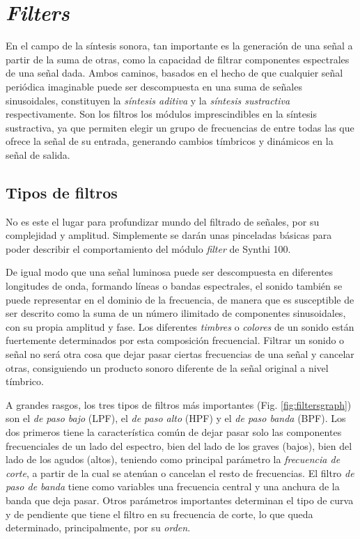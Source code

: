 \section{\textit{Filters}}

En el campo de la síntesis sonora, tan importante es la generación de una señal a partir de la suma de otras, como la capacidad de filtrar componentes espectrales de una señal dada. Ambos caminos, basados en el hecho de que cualquier señal periódica imaginable puede ser descompuesta en una suma de señales sinusoidales, constituyen la \textit{síntesis aditiva} y la \textit{síntesis sustractiva} respectivamente. Son los filtros los módulos imprescindibles en la síntesis sustractiva, ya que permiten elegir un grupo de frecuencias de entre todas las que ofrece la señal de su entrada, generando cambios tímbricos y dinámicos en la señal de salida.

\subsection{Tipos de filtros}

No es este el lugar para profundizar mundo del filtrado de señales, por su complejidad y amplitud. Simplemente se darán unas pinceladas básicas para poder describir el comportamiento del módulo \textit{filter} de Synthi 100.

De igual modo que una señal luminosa puede ser descompuesta en diferentes longitudes de onda, formando líneas o bandas espectrales, el sonido también se puede representar en el dominio de la frecuencia, de manera que es susceptible de ser descrito como la suma de un número ilimitado de componentes sinusoidales, con su propia amplitud y fase. Los diferentes \textit{timbres} o \textit{colores} de un sonido están fuertemente determinados por esta composición frecuencial. Filtrar un sonido o señal no será otra cosa que dejar pasar ciertas frecuencias de una señal y cancelar otras, consiguiendo un producto sonoro diferente de la señal original a nivel tímbrico.

A grandes rasgos, los tres tipos de filtros más importantes (Fig. \ref{fig:filtersgraph}) son el \textit{de paso bajo} (LPF), el \textit{de paso alto} (HPF) y el \textit{de paso banda} (BPF). Los dos primeros tiene la característica común de dejar pasar solo las componentes frecuenciales de un lado del espectro, bien del lado de los graves (bajos), bien del lado de los agudos (altos), teniendo como principal parámetro la \textit{frecuencia de corte}, a partir de la cual se atenúan o cancelan el resto de frecuencias. El filtro \textit{de paso de banda} tiene como variables una frecuencia central y una anchura de la banda que deja pasar. Otros parámetros importantes determinan el tipo de curva y de pendiente que tiene el filtro en su frecuencia de corte, lo que queda determinado, principalmente, por su \textit{orden}. 

